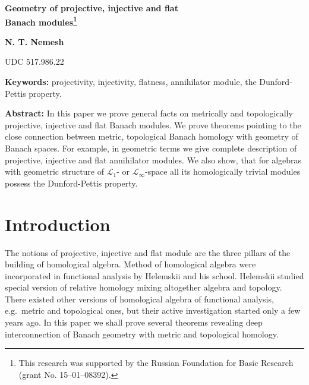 \documentclass[12pt]{article}
\begin{document}
\begin{flushleft}
    \Large \textbf{Geometry of projective, injective and flat\\
        Banach modules\footnote{This research was supported by the Russian
            Foundation for Basic Research (grant No. 15--01--08392).}}\\[0.5cm]
\end{flushleft}
\begin{flushright}
    \normalsize \textbf{N. T. Nemesh}\\[0.5cm]
\end{flushright}
\begin{flushleft}
    \small {UDC 517.986.22}\\[0.5cm]
\end{flushleft}

\thispagestyle{empty}

\textbf{Keywords:} projectivity, injectivity, flatness, annihilator module, the
Dunford-Pettis property.
\medskip

\textbf{Abstract:} In this paper we prove general facts on metrically and
topologically projective, injective and flat Banach modules. We prove theorems
pointing to the close connection between metric, topological Banach homology
with geometry of Banach spaces. For example, in geometric terms we give complete
description of projective, injective and flat annihilator modules. We also show,
that for algebras with geometric structure of $\mathscr{L}_1$- or
$\mathscr{L}_\infty$-space all its homologically trivial modules possess the
Dunford-Pettis property.
\medskip


\section{Introduction}\label{SectionIntroduction}

The notions of projective, injective and flat module are the three pillars of
the building of homological algebra. Method of homological algebra were
incorporated in functional analysis by Helemskii and his school. Helemskii
studied special version of relative homology mixing altogether algebra and
topology. There existed other versions of homological algebra of functional
analysis, e.g.\ metric and topological ones, but their active investigation
started only a few years ago. In this paper we shall prove several theorems
revealing deep interconnection of Banach geometry with metric and topological
homology.
\end{document}
